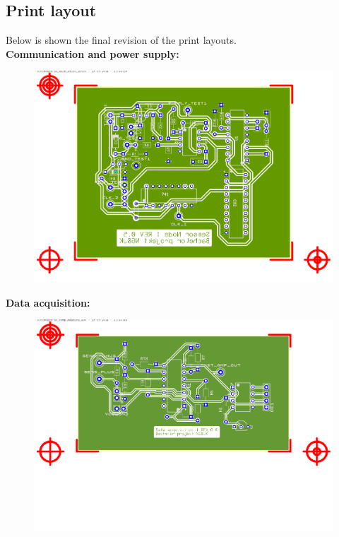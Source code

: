 \subsection{Print layout}
Below is shown the final revision of the print layouts.\\
\textbf{Communication and power supply:}\\
\begin{figure}[H]
	\centering
	\includegraphics[width=.85\textwidth]{billeder/SN_ps_com}
\end{figure}
\textbf{Data acquisition:}\\
\begin{figure}[H]
	\centering
	\includegraphics[width=.8\textwidth]{billeder/SN_data_acq}
\end{figure}




